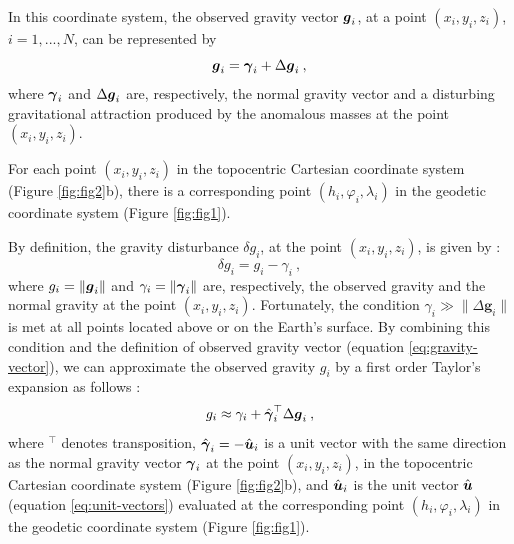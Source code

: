 \documentclass[extra]{gji}
\begin{document}
In this coordinate system, the observed gravity vector
$\mitbf{g}_{i}$, at a point $(x_{i}, y_{i}, z_{i})$, 
$i = 1, ..., N$, can be represented by
\begin{equation}
\mitbf{g}_{i} = \mitbf{\gamma}_{i} + \Delta \mitbf{g}_{i} \: ,
\label{eq:gravity-vector}
\end{equation}
where $\mitbf{\gamma}_{i}$ and $\Delta \mitbf{g}_{i}$
are, respectively, the normal gravity vector and a
disturbing gravitational attraction produced by the anomalous 
masses at the point $(x_{i}, y_{i}, z_{i})$.

For each point $(x_{i}, y_{i}, z_{i})$ in the topocentric
Cartesian coordinate system (Figure \ref{fig:fig2}b), there is
a corresponding point $(h_{i}, \varphi_{i}, \lambda_{i})$
in the geodetic coordinate system (Figure \ref{fig:fig1}).


By definition, the gravity disturbance $\delta g_{i}$,
at the point $(x_{i}, y_{i}, z_{i})$, is given by 
\citep{heiskanen-moritz1967, hofmann-wellenhof-moritz2005}:
\begin{equation}
\delta g_{i} =  g_{i} - \gamma_{i} \: ,
\label{eq:gravity-disturbance}
\end{equation}
where $g_{i} = \| \mitbf{g}_{i} \|$ and 
$\gamma_{i} = \| \mitbf{\gamma}_{i} \|$ are,
respectively, the observed gravity and the normal gravity at the
point $(x_{i}, y_{i}, z_{i})$.
Fortunately, the condition 
$\gamma_{i} \gg \| \Delta \mathbf{g}_{i} \|$ 
is met at all points located above or on the Earth's surface.
By combining this condition and the definition of observed gravity vector
(equation \ref{eq:gravity-vector}), we can approximate the observed gravity
$g_{i}$ by a first order Taylor's expansion as follows 
\citep{sanso_sideris2013}:
\begin{equation}
g_{i} \approx \gamma_{i} + 
\hat{\mitbf{\gamma}}_{i}^{\top} \Delta \mitbf{g}_{i} \: ,
\label{eq:gobs-approx}
\end{equation}
where $^{\top}$ denotes transposition,
$\hat{\mitbf{\gamma}}_{i} = -\hat{\mitbf{u}}_{i}$ is a unit 
vector with the same direction as the normal gravity vector 
$\mitbf{\gamma}_{i}$ at the point $(x_{i}, y_{i}, z_{i})$, in the
topocentric Cartesian coordinate system (Figure \ref{fig:fig2}b), and
$\hat{\mitbf{u}}_{i}$ is the unit vector $\hat{\mitbf{u}}$ 
(equation \ref{eq:unit-vectors}) evaluated at the corresponding 
point $(h_{i}, \varphi_{i}, \lambda_{i})$ in the 
geodetic coordinate system (Figure \ref{fig:fig1}).
\end{document}
